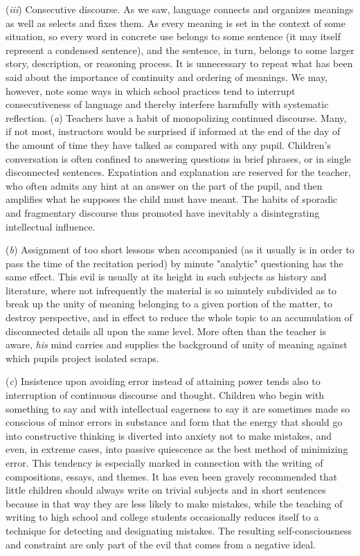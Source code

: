 \documentclass[showtrims,ustradepaper]{memoir}
\begin{document}

(\emph{iii}) Consecutive discourse. As we saw, language connects and
organizes meanings as well as selects and fixes them. As every meaning
is set in the context of some situation, so every word in concrete use
belongs to some sentence (it may itself represent a condensed sentence),
and the sentence, in turn, belongs to some larger story, description, or
reasoning process. It is unnecessary to repeat what has been said about
the importance of continuity and ordering of meanings. We may, however,
note some ways in which school practices tend to interrupt
consecutiveness of language and thereby interfere harmfully with
systematic reflection. (\emph{a}) Teachers have a habit of monopolizing
continued discourse. Many, if not most, instructors would be surprised
if informed at the end of the day of the amount of time they have talked
as compared with any pupil. Children's conversation is often confined to
answering questions in brief phrases, or in single disconnected
sentences.
Expatiation
and explanation are reserved for the teacher, who often admits any hint
at an answer on the part of the pupil, and then amplifies what he
supposes the child must have meant. The habits of sporadic and
fragmentary discourse thus promoted have inevitably a disintegrating
intellectual influence.


(\emph{b}) Assignment of too short lessons when accompanied (as it
usually is in order to pass the time of the recitation period) by minute
"analytic" questioning has the same effect. This evil is usually at its
height in such subjects as history and literature, where not
infrequently the material is so minutely subdivided as to break up the
unity of meaning belonging to a given portion of the matter, to destroy
perspective, and in effect to reduce the whole topic to an accumulation
of disconnected details all upon the same level. More often than the
teacher is aware, \emph{his} mind carries and supplies the background of
unity of meaning against which pupils project isolated scraps.


(\emph{c}) Insistence upon avoiding error instead of attaining power
tends also to interruption of continuous discourse and thought. Children
who begin with something to say and with intellectual eagerness to say
it are sometimes made so conscious of minor errors in substance and form
that the energy that should go into constructive thinking is diverted
into anxiety not to make mistakes, and even, in extreme cases, into
passive quiescence as the best method of minimizing error. This tendency
is especially marked in connection with the writing of compositions,
essays, and themes. It has even been gravely recommended that little
children should always write on trivial subjects and in short sentences
because in that way they are less likely to make mistakes,
while
the teaching of writing to high school and college students occasionally
reduces itself to a technique for detecting and designating mistakes.
The resulting self-consciousness and constraint are only part of the
evil that comes from a negative
ideal.
\end{document}
